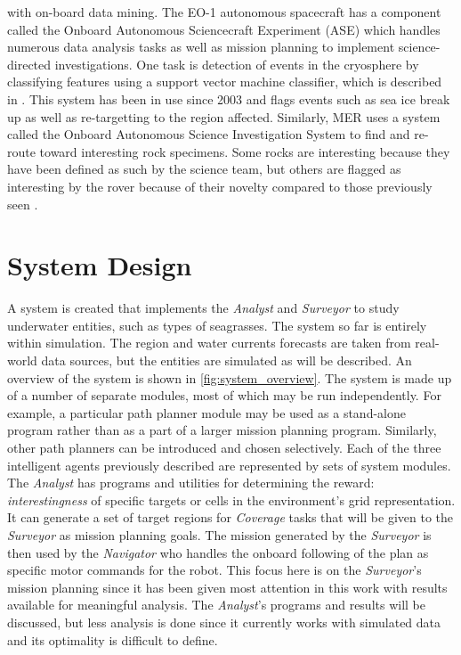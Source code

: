 \documentclass{tamuccthesis}
\begin{document}
with on-board data mining. The EO-1 autonomous spacecraft has a component called the Onboard Autonomous Sciencecraft Experiment (ASE) which handles numerous data analysis tasks as well as mission planning to implement science-directed investigations. One task is detection of events in the cryosphere by classifying features using a support vector machine classifier, which is described in \cite{castano:2006:onboard}. This system has been in use since 2003 and flags events such as sea ice break up as well as re-targetting to the region affected. Similarly, MER uses a system called the Onboard Autonomous Science Investigation System to find and re-route toward interesting rock specimens. Some rocks are interesting because they have been defined as such by the science team, but others are flagged as interesting by the rover because of their novelty compared to those previously seen \cite{castano:2006:onboard}.

\chapter{System Design}

A system is created that implements the \textit{Analyst} and \textit{Surveyor} to study underwater entities, such as types of seagrasses. The system so far is entirely within simulation. The region and water currents forecasts are taken from real-world data sources, but the entities are simulated as will be described. An overview of the system is shown in \ref{fig:system_overview}. The system is made up of a number of separate modules, most of which may be run independently. For example, a particular path planner module may be used as a stand-alone program rather than as a part of a larger mission planning program. Similarly, other path planners can be introduced and chosen selectively. Each of the three intelligent agents previously described are represented by sets of system modules. The \textit{Analyst} has programs and utilities for determining the reward: \textit{interestingness} of specific targets or cells in the environment's grid representation. It can generate a set of target regions for \textit{Coverage} tasks that will be given to the \textit{Surveyor} as mission planning goals. The mission generated by the \textit{Surveyor} is then used by the \textit{Navigator} who handles the onboard following of the plan as specific motor commands for the robot. This focus here is on the \textit{Surveyor}'s mission planning since it has been given most attention in this work with results available for meaningful analysis. The \textit{Analyst}'s programs and results will be discussed, but less analysis is done since it currently works with simulated data and its optimality is difficult to define.
\end{document}
